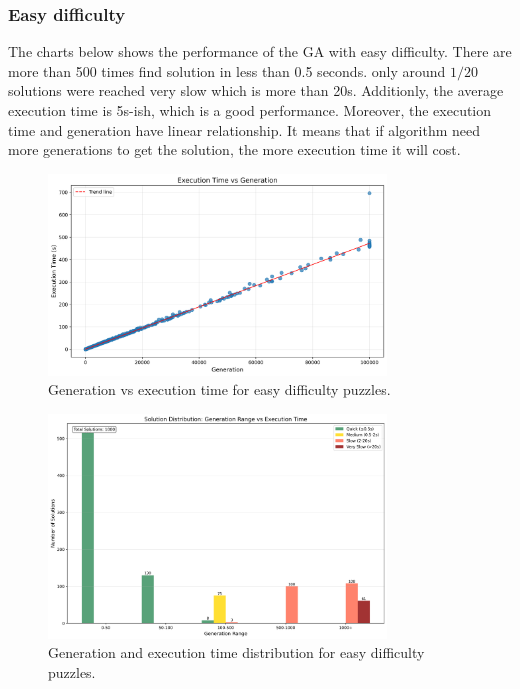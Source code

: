 \subsubsection{Easy difficulty}

The charts below shows the performance of the GA with easy difficulty. There are more than 500 times find solution in less than 0.5 seconds. only around $1/20$ solutions were reached very slow which is more than 20s.
Additionly, the average execution time is 5s-ish, which is a good performance. Moreover, the execution time and generation have linear relationship. It means that if algorithm need more generations to get the solution, the more execution time it will cost.

\begin{figure}[h]
\centering
\includegraphics[width=0.8\textwidth]{resources/generation_vs_execution_time_easy.png}
\caption{Generation vs execution time for easy difficulty puzzles.}
\label{fig:generation_vs_execution_time_easy}
\end{figure}

\begin{figure}[h]
\centering
\includegraphics[width=0.8\textwidth]{resources/generation_execution_time_bars_easy.png}
\caption{Generation and execution time distribution for easy difficulty puzzles.}
\label{fig:generation_execution_time_bars_easy}
\end{figure}

